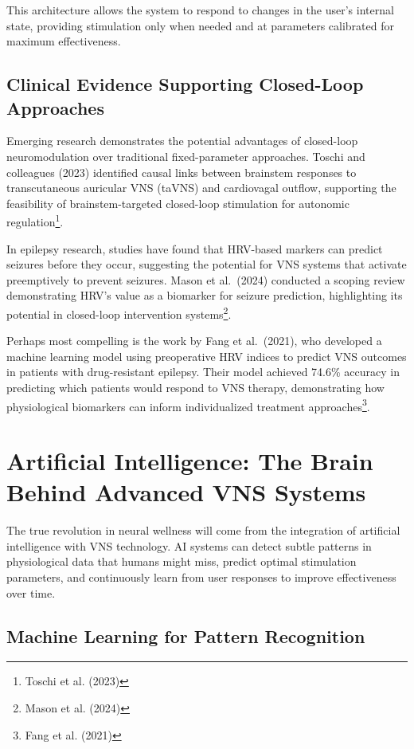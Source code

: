 \documentclass[
  Letterpaper,
]{scrbook}
\begin{document}
This architecture allows the system to respond to changes in the user's
internal state, providing stimulation only when needed and at parameters
calibrated for maximum effectiveness.

\subsection{Clinical Evidence Supporting Closed-Loop
Approaches}\label{clinical-evidence-supporting-closed-loop-approaches}

Emerging research demonstrates the potential advantages of closed-loop
neuromodulation over traditional fixed-parameter approaches. Toschi and
colleagues (2023) identified causal links between brainstem responses to
transcutaneous auricular VNS (taVNS) and cardiovagal outflow, supporting
the feasibility of brainstem-targeted closed-loop stimulation for
autonomic regulation\footnote{Toschi et al. (2023)}.

In epilepsy research, studies have found that HRV-based markers can
predict seizures before they occur, suggesting the potential for VNS
systems that activate preemptively to prevent seizures. Mason et
al.~(2024) conducted a scoping review demonstrating HRV's value as a
biomarker for seizure prediction, highlighting its potential in
closed-loop intervention systems\footnote{Mason et al. (2024)}.

Perhaps most compelling is the work by Fang et al.~(2021), who developed
a machine learning model using preoperative HRV indices to predict VNS
outcomes in patients with drug-resistant epilepsy. Their model achieved
74.6\% accuracy in predicting which patients would respond to VNS
therapy, demonstrating how physiological biomarkers can inform
individualized treatment approaches\footnote{Fang et al. (2021)}.

\section{Artificial Intelligence: The Brain Behind Advanced VNS
Systems}\label{artificial-intelligence-the-brain-behind-advanced-vns-systems}

The true revolution in neural wellness will come from the integration of
artificial intelligence with VNS technology. AI systems can detect
subtle patterns in physiological data that humans might miss, predict
optimal stimulation parameters, and continuously learn from user
responses to improve effectiveness over time.

\subsection{Machine Learning for Pattern
Recognition}\label{machine-learning-for-pattern-recognition}
\end{document}
